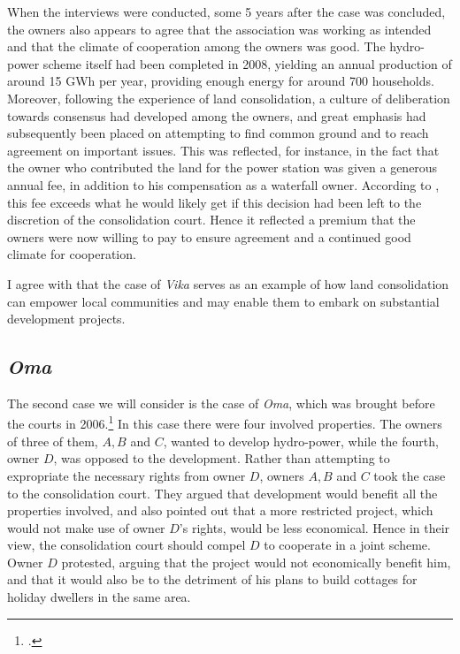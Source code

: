 When the interviews were conducted, some 5 years after the case was concluded, the owners also appears to agree that the association was working as intended and that the climate of cooperation among the owners was good. The hydro-power scheme itself had been completed in 2008, yielding an annual production of around 15 GWh per year, providing enough energy for around 700 households. Moreover, following the experience of land consolidation, a culture of deliberation towards consensus had developed among the owners, and great emphasis had subsequently been placed on attempting to find common ground and to reach agreement on important issues. This was reflected, for instance, in the fact that the owner who contributed the land for the power station was given a generous annual fee, in addition to his compensation as a waterfall owner. According to \cite{stokstad11}, this fee exceeds what he would likely get if this decision had been left to the discretion of the consolidation court. Hence it reflected a premium that the owners were now willing to pay to ensure agreement and a continued good climate for cooperation.

I agree with \cite{stokstad11} that the case of \emph{Vika} serves as an example of how land consolidation can empower local communities and may enable them to embark on substantial development projects.

\subsection{\emph{Oma}}

The second case we will consider is the case of \emph{Oma}, which was brought before the courts in 2006.\footcite{oma06} In this case there were four involved properties. The owners of three of them, $A,B$ and $C$, wanted to develop hydro-power, while the fourth, owner $D$, was opposed to the development. Rather than attempting to expropriate the necessary rights from owner $D$, owners $A,B$ and $C$ took the case to the consolidation court. They argued that development would benefit all the properties involved, and also pointed out that a more restricted project, which would not make use of owner $D$'s rights, would be less economical. Hence in their view, the consolidation court should compel $D$ to cooperate in a joint scheme. Owner $D$ protested, arguing that the project would not economically benefit him, and that it would also be to the detriment of his plans to build cottages for holiday dwellers in the same area.

